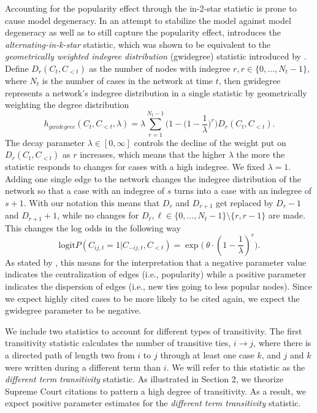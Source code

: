\documentclass{cup-pan}
\begin{document}
Accounting for the popularity effect through the in-2-star statistic is prone to cause model degeneracy. In an attempt to stabilize the model against model degeneracy as well as to still capture the popularity effect, \citet{SnijdersTomA.B..2006} introduces the \textit{alternating-in-k-star} statistic, which was shown to be equivalent to the \textit{geometrically weighted indegree distribution} (gwidegree) statistic introduced by \citet{hunter2006inference}. Define $D_r(C_t, C_{<t})$ as the number of nodes with indegree $r, r \in \{0, \dots , N_t -1 \}$, where $N_t$ is the number of cases in the network at time $t$, then gwidegree represents a network's indegree distribution in a single statistic by geometrically weighting the degree distribution
\begin{equation}
h_{gwidegree}(C_{t}, C_{<t}, \lambda)= \lambda \sum_{r=1}^{N_t-1}\biggl(1-\bigl(1-\frac{1}{\lambda}\bigr)^r\biggr)D_r(C_t, C_{<t}). 
\label{gwidegree}
\end{equation}
The decay parameter $\lambda \in [0, \infty ]$ controls the decline of the weight put on $D_r(C_t, C_{<t})$ as $r$ increases, which means that the higher $\lambda$ the more the statistic responds to changes for cases with a high indegree. We fixed $\lambda=1$. Adding one single edge to the network changes the indegree distribution of the network so that a case with an indegree of $s$ turns into a case with an indegree of $s + 1$. With our notation this means that $D_r$ and $D_{r+1}$ get replaced by
$D_r -1$ and $D_{r+1} +1$, while no changes for $D_\ell,
 \ell \in \{0, \dots , N_t -1 \} \setminus \{r, r-1\} $ are
made. This changes the log odds in the following way
$$\text{logit} P(C_{ij,t}=1 | C_{-ij,t}, C_{<t}) = \exp \bigl(~\theta \cdot( 1- \frac{1}{\lambda})^r \bigr).$$
As stated by \citet{Levy2016}, this means for the interpretation that a negative parameter value indicates the centralization of edges (i.e., popularity) while a positive parameter indicates the dispersion of edges (i.e., new ties going to less popular nodes). Since we expect highly cited cases to be more likely to be cited again, we expect the gwidegree parameter to be negative.


We include two statistics to account for different types of transitivity.
The first transitivity statistic calculates the number of transitive ties, $i \to j$, where there is a directed path of length two from $i$ to $j$ through at least one case $k$, and $j$ and $k$ were written during a different term than $i$. We will refer to this statistic as the \textit{different term transitivity} statistic. As illustrated in Section 2, we theorize Supreme Court citations to pattern a high degree of transitivity. As a result, we expect positive parameter estimates for the \textit{different term transitivity} statistic. 
\end{document}
